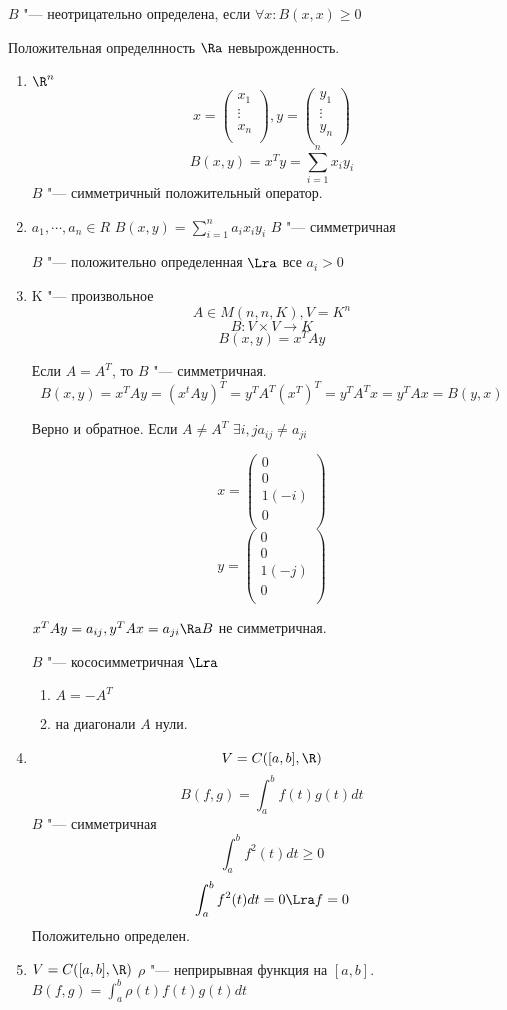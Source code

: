 \begin{Def}
$B$ "--- неотрицательно определена, если $\forall x \colon B(x, x) \ge 0$
\end{Def}
\begin{Rem}
Положительная определнность $\Ra$ невырожденность.
\end{Rem}
\begin{exmp}
\begin{enumerate}
\item $\R^n$
$$x = 
\begin{pmatrix}
x_1\\
\vdots\\
x_n\\
\end{pmatrix}, 
y = 
\begin{pmatrix}
y_1\\
\vdots\\
y_n\\
\end{pmatrix}$$
$$B(x, y) = x^{T}y = \sum_{i = 1}^{n}x_iy_i$$
$B$ "--- симметричный положительный оператор.
\item $a_1, \cdots, a_n \in R$
$B(x, y) = \sum_{i = 1}^{n}a_ix_iy_i$
$B$ "--- симметричная

$B$ "--- положительно определенная $\Lra$ все $a_i > 0$

\item K "--- произвольное 
$$A \in M(n, n, K), V = K^{n}$$
$$B \colon V \times V \to K$$
$$B(x, y) = x^{T}Ay$$

Если $A = A^{T}$, то $B$ "--- симметричная.
$$B(x, y) = x^TAy = (x^tAy)^T = y^TA^T(x^T)^T = y^TA^Tx = y^TAx = B(y, x)$$

Верно и обратное.
Если $A \ne A^{T}$
$\exists i, j a_{ij} \ne a_{ji}$

$$x = 
\begin{pmatrix}
0\\
0\\
1(-i)\\
0\\
\end{pmatrix}$$
$$y = 
\begin{pmatrix}
0\\
0\\
1(-j)\\
0\\
\end{pmatrix}$$

$x^{T}Ay = a_{ij}, y^TAx = a_{ji} \Ra B$ не симметричная.

$B$ "--- кососимметричная $\Lra$
\begin{enumerate}
\item $A = -A^{T}$
\item на диагонали $A$ нули. 
\end{enumerate}
\item
 $$V = C([a, b], \R)$$
 $$B(f, g) = \int_{a}^{b}f(t)g(t)dt$$
 $B$ "--- симметричная
 $$\int_{a}^{b}f^2(t)dt \ge 0$$
 $$\int_{a}^{b}f^2(t)dt = 0 \Lra f = 0$$
 Положительно определен.
\item $V = C([a, b], \R)$
$\rho$ "--- неприрывная функция на $[a, b]$.
$B(f, g) = \int_{a}^{b}\rho(t)f(t)g(t)dt$


\end{enumerate}
\end{exmp}

